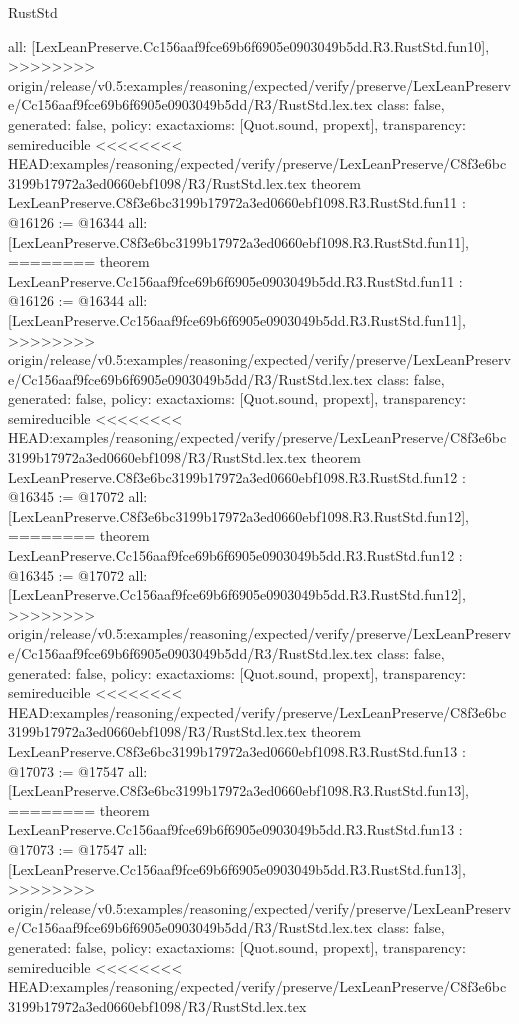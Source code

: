 \begin{lexlean}{RustStd}
\begin{coremodule}
{\begin{coremodule}
{{{{{{{{{{{{{{  all: [LexLeanPreserve.Cc156aaf9fce69b6f6905e0903049b5dd.R3.RustStd.fun10],
>>>>>>>> origin/release/v0.5:examples/reasoning/expected/verify/preserve/LexLeanPreserve/Cc156aaf9fce69b6f6905e0903049b5dd/R3/RustStd.lex.tex
  class: false,
  generated: false,
  policy: exact{axioms: [Quot.sound, propext]},
  transparency: semireducible
}
<<<<<<<< HEAD:examples/reasoning/expected/verify/preserve/LexLeanPreserve/C8f3e6bc3199b17972a3ed0660ebf1098/R3/RustStd.lex.tex
theorem LexLeanPreserve.C8f3e6bc3199b17972a3ed0660ebf1098.R3.RustStd.fun11 : @16126 := @16344 {
  all: [LexLeanPreserve.C8f3e6bc3199b17972a3ed0660ebf1098.R3.RustStd.fun11],
========
theorem LexLeanPreserve.Cc156aaf9fce69b6f6905e0903049b5dd.R3.RustStd.fun11 : @16126 := @16344 {
  all: [LexLeanPreserve.Cc156aaf9fce69b6f6905e0903049b5dd.R3.RustStd.fun11],
>>>>>>>> origin/release/v0.5:examples/reasoning/expected/verify/preserve/LexLeanPreserve/Cc156aaf9fce69b6f6905e0903049b5dd/R3/RustStd.lex.tex
  class: false,
  generated: false,
  policy: exact{axioms: [Quot.sound, propext]},
  transparency: semireducible
}
<<<<<<<< HEAD:examples/reasoning/expected/verify/preserve/LexLeanPreserve/C8f3e6bc3199b17972a3ed0660ebf1098/R3/RustStd.lex.tex
theorem LexLeanPreserve.C8f3e6bc3199b17972a3ed0660ebf1098.R3.RustStd.fun12 : @16345 := @17072 {
  all: [LexLeanPreserve.C8f3e6bc3199b17972a3ed0660ebf1098.R3.RustStd.fun12],
========
theorem LexLeanPreserve.Cc156aaf9fce69b6f6905e0903049b5dd.R3.RustStd.fun12 : @16345 := @17072 {
  all: [LexLeanPreserve.Cc156aaf9fce69b6f6905e0903049b5dd.R3.RustStd.fun12],
>>>>>>>> origin/release/v0.5:examples/reasoning/expected/verify/preserve/LexLeanPreserve/Cc156aaf9fce69b6f6905e0903049b5dd/R3/RustStd.lex.tex
  class: false,
  generated: false,
  policy: exact{axioms: [Quot.sound, propext]},
  transparency: semireducible
}
<<<<<<<< HEAD:examples/reasoning/expected/verify/preserve/LexLeanPreserve/C8f3e6bc3199b17972a3ed0660ebf1098/R3/RustStd.lex.tex
theorem LexLeanPreserve.C8f3e6bc3199b17972a3ed0660ebf1098.R3.RustStd.fun13 : @17073 := @17547 {
  all: [LexLeanPreserve.C8f3e6bc3199b17972a3ed0660ebf1098.R3.RustStd.fun13],
========
theorem LexLeanPreserve.Cc156aaf9fce69b6f6905e0903049b5dd.R3.RustStd.fun13 : @17073 := @17547 {
  all: [LexLeanPreserve.Cc156aaf9fce69b6f6905e0903049b5dd.R3.RustStd.fun13],
>>>>>>>> origin/release/v0.5:examples/reasoning/expected/verify/preserve/LexLeanPreserve/Cc156aaf9fce69b6f6905e0903049b5dd/R3/RustStd.lex.tex
  class: false,
  generated: false,
  policy: exact{axioms: [Quot.sound, propext]},
  transparency: semireducible
}
<<<<<<<< HEAD:examples/reasoning/expected/verify/preserve/LexLeanPreserve/C8f3e6bc3199b17972a3ed0660ebf1098/R3/RustStd.lex.tex
}}}}}}}}}}}}}}}}
\end{coremodule}}
\end{coremodule}
\end{lexlean}
